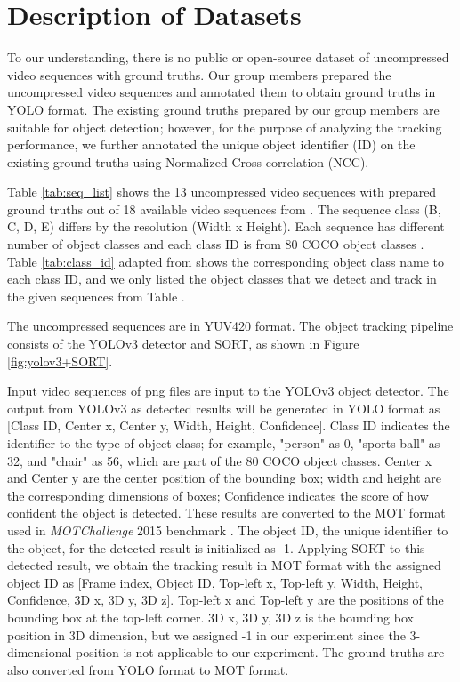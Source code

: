 \section{Description of Datasets}
\label{sec:methods/section_a}

To our understanding, there is no public or open-source dataset of uncompressed video sequences with ground truths. Our group members prepared the uncompressed video sequences and annotated them to obtain ground truths in YOLO format. The existing ground truths prepared by our group members are suitable for object detection; however, for the purpose of analyzing the tracking performance, we further annotated the unique object identifier (ID) on the existing ground truths using Normalized Cross-correlation (NCC).

Table \ref{tab:seq_list} shows the 13 uncompressed video sequences with prepared ground truths out of 18 available video sequences from \cite{choi_vcm_2020}. The sequence class (B, C, D, E) differs by the resolution (Width x Height). Each sequence has different number of object classes and each class ID is from 80 COCO object classes \cite{lin_microsoft_2014}. Table \ref{tab:class_id} adapted from \cite{choi_vcm_2020} shows the corresponding object class name to each class ID, and we only listed the object classes that we detect and track in the given sequences from Table \cite{tab:seq_list}.

The uncompressed sequences are in YUV420 format. The object tracking pipeline consists of the YOLOv3 detector and SORT, as shown in Figure \ref{fig:yolov3+SORT}. 

Input video sequences of png files are input to the YOLOv3 object detector. The output from YOLOv3 as detected results will be generated in YOLO format as [Class ID, Center x, Center y, Width, Height, Confidence]. Class ID indicates the identifier to the type of object class; for example, "person" as 0, "sports ball" as 32, and "chair" as 56, which are part of the 80 COCO object classes. Center x and Center y are the center position of the bounding box; width and height are the corresponding dimensions of boxes; Confidence indicates the score of how confident the object is detected. These results are converted to the MOT format used in \textit{MOTChallenge} 2015 benchmark \cite{leal-taixe_motchallenge_2015}. The object ID, the unique identifier to the object, for the detected result is initialized as -1. Applying SORT to this detected result, we obtain the tracking result in MOT format with the assigned object ID as [Frame index, Object ID, Top-left x, Top-left y, Width, Height, Confidence, 3D x, 3D y, 3D z]. Top-left x and Top-left y are the positions of the bounding box at the top-left corner. 3D x, 3D y, 3D z is the bounding box position in 3D dimension, but we assigned -1 in our experiment since the 3-dimensional position is not applicable to our experiment. The ground truths are also converted from YOLO format to MOT format.

